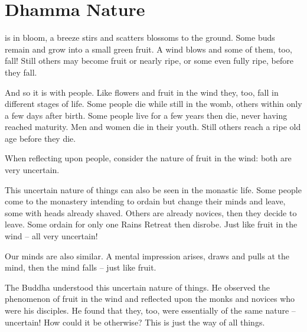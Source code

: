 
\chapter{Dhamma Nature}

\vspace*{0.5\baselineskip}
 is in bloom, a breeze stirs and scatters blossoms to the ground. Some buds remain and grow into a small green fruit. A wind blows and some of them, too, fall! Still others may become fruit or nearly ripe, or some even fully ripe, before they fall. 

And so it is with people. Like flowers and fruit in the wind they, too, fall in different stages of life. Some people die while still in the womb, others within only a few days after birth. Some people live for a few years then die, never having reached maturity. Men and women die in their youth. Still others reach a ripe old age before they die. 

When reflecting upon people, consider the nature of fruit in the wind: both are very uncertain. 

This uncertain nature of things can also be seen in the monastic life. Some people come to the monastery intending to ordain but change their minds and leave, some with heads already shaved. Others are already novices, then they decide to leave. Some ordain for only one Rains Retreat then disrobe. Just like fruit in the wind -- all very uncertain! 

Our minds are also similar. A mental impression arises, draws and pulls at the mind, then the mind falls -- just like fruit. 

The Buddha understood this uncertain nature of things. He observed the phenomenon of fruit in the wind and reflected upon the monks and novices who were his disciples. He found that they, too, were essentially of the same nature -- uncertain! How could it be otherwise? This is just the way of all things. 

